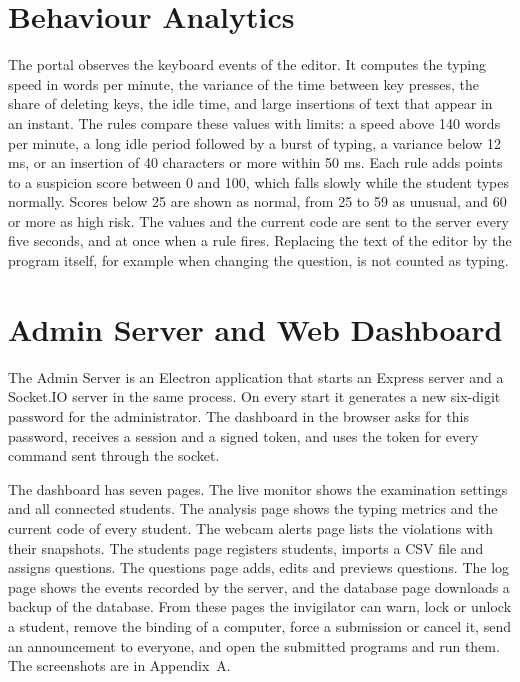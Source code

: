 \documentclass[12pt,a4paper]{report}
\begin{document}
\section{Behaviour Analytics}
The portal observes the keyboard events of the editor. It computes the typing speed in words per minute, the variance of the time between key presses, the share of deleting keys, the idle time, and large insertions of text that appear in an instant. The rules compare these values with limits: a speed above 140 words per minute, a long idle period followed by a burst of typing, a variance below 12 ms, or an insertion of 40 characters or more within 50 ms. Each rule adds points to a suspicion score between 0 and 100, which falls slowly while the student types normally. Scores below 25 are shown as normal, from 25 to 59 as unusual, and 60 or more as high risk. The values and the current code are sent to the server every five seconds, and at once when a rule fires. Replacing the text of the editor by the program itself, for example when changing the question, is not counted as typing.

\section{Admin Server and Web Dashboard}
The Admin Server is an Electron application that starts an Express server and a Socket.IO server in the same process. On every start it generates a new six-digit password for the administrator. The dashboard in the browser asks for this password, receives a session and a signed token, and uses the token for every command sent through the socket.

The dashboard has seven pages. The live monitor shows the examination settings and all connected students. The analysis page shows the typing metrics and the current code of every student. The webcam alerts page lists the violations with their snapshots. The students page registers students, imports a CSV file and assigns questions. The questions page adds, edits and previews questions. The log page shows the events recorded by the server, and the database page downloads a backup of the database. From these pages the invigilator can warn, lock or unlock a student, remove the binding of a computer, force a submission or cancel it, send an announcement to everyone, and open the submitted programs and run them. The screenshots are in Appendix~A.
\end{document}

